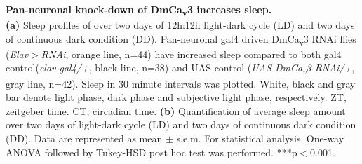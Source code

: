 \label{fig:5}
\textbf{Pan-neuronal knock-down of DmCa\textsubscript{v}3 increases sleep.}
\\
\textbf{(a)} Sleep profiles of over two days of 12h:12h light-dark cycle (LD) and two days of continuous dark condition (DD). Pan-neuronal gal4 driven DmCa\textsubscript{v}3 RNAi flies (\emph{Elav$>$RNAi}, orange line, n=44) have increased sleep compared to both gal4 control(\emph{elav-gal4/+}, black line, n=38) and UAS control (\emph{UAS-DmCa\textsubscript{v}3 RNAi/+}, gray line, n=42). 
Sleep in 30 minute intervals was plotted.
White, black and gray bar denote light phase, dark phase and subjective light phase, respectively.
ZT, zeitgeber time.
CT, circadian time.
\textbf{(b)} Quantification of average sleep amount over two days of light-dark cycle (LD) and two days of continuous dark condition (DD).
Data are represented as mean $\pm$ s.e.m.
For statistical analysis, One-way ANOVA followed by Tukey-HSD post hoc test was performed.
***p$<$0.001.
  
  
  
  
  
  
  
  
  